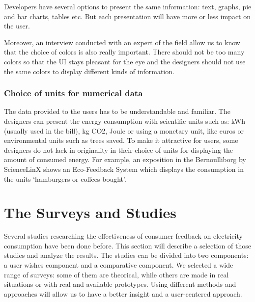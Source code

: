 \documentclass[journal]{vgtc}                %
\begin{document}
Developers have several options to present the same information: text, graphs, pie and bar charts, tables etc. But each presentation will have more or less impact on the user.

Moreover, an interview conducted with an expert of the field allow us to know that the choice of colors is also really important. There should not be too many colors so that the UI stays pleasant for the eye and the designers should not use the same colors to display different kinds of information.

\subsubsection{Choice of units for numerical data}
The data provided to the users has to be understandable and familiar. The designers can present the energy consumption with scientific units such as: kWh (usually used in the bill), kg CO2, Joule or using a monetary unit, like euros or environmental units such as trees saved.
To make it attractive for users, some designers do not lack in originality in their choice of units for displaying the amount of consumed energy. For example, an exposition in the Bernoulliborg by ScienceLinX shows an Eco-Feedback System which displays the consumption in the units ‘hamburgers or coffees bought’.


\section{The Surveys and Studies}
Several studies researching the effectiveness of consumer feedback on electricity consumption have been done before.
This section will describe a selection of those studies and analyze the results.
The studies can be divided into two components: a user wishes component and a comparative component.
We selected a wide range of surveys: some of them are theorical, while others are made in real situations or with real and available prototypes. Using different methods and approaches will allow us to have a better insight and a user-centered approach.
\end{document}
